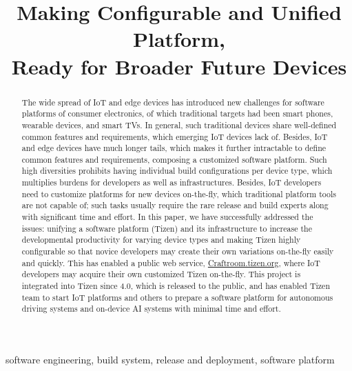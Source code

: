 \documentclass[10pt,conference,letterpaper]{IEEEtran}
\begin{document}
\title{Making Configurable and Unified Platform, \\
Ready for Broader Future Devices}

\author{
\IEEEauthorblockA{\textit{Samsung Research, Samsung Electronics} \\
Seoul, Republic of Korea \\
\{myungjoo.ham, geunsik.lim\}@samsung.com}
}
\maketitle

\begin{abstract}
The wide spread of IoT and edge devices has introduced new challenges for software platforms of consumer electronics, of which traditional targets had been smart phones, wearable devices, and smart TVs.
In general, such traditional devices share well-defined common features and requirements, which emerging IoT devices lack of.
Besides, IoT and edge devices have much longer tails, which makes it further intractable to define common features and requirements, composing a customized software platform.
Such high diversities prohibits having individual build configurations per device type, which multiplies burdens for developers as well as infrastructures.
Besides, IoT developers need to customize platforms for new devices on-the-fly, which traditional platform tools are not capable of; such tasks usually require the rare release and build experts along with significant time and effort.
In this paper, we have successfully addressed the issues: unifying a software platform (Tizen) and its infrastructure to increase the developmental productivity for varying device types and making Tizen highly configurable so that novice developers may create their own variations on-the-fly easily and quickly.
This has enabled a public web service, \url{Craftroom.tizen.org}, where IoT developers may acquire their own customized Tizen on-the-fly.
This project is integrated into Tizen since 4.0, which is released to the public, and has enabled Tizen team to start IoT platforms and others to prepare a software platform for autonomous driving systems and on-device AI systems with minimal time and effort.
\end{abstract}

\begin{IEEEkeywords}
software engineering, build system, release and deployment, software platform
\end{IEEEkeywords}
\end{document}
